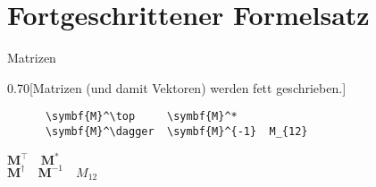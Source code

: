 \section{Fortgeschrittener Formelsatz}

\begin{frame}[fragile]{
  Matrizen
  \hfill{}
}
  \begin{CodeExample}{0.70}[Matrizen (und damit Vektoren) werden fett geschrieben.]
    \begin{lstlisting}
      \symbf{M}^\top     \symbf{M}^*
      \symbf{M}^\dagger  \symbf{M}^{-1}  M_{12}
    \end{lstlisting}
  \CodeResult
    \strut
    $\symbf{M}^\top    \quad \symbf{M}^*$ \\
    $\symbf{M}^\dagger \quad \symbf{M}^{-1} \quad M_{12}$
  \end{CodeExample}


\end{frame}
